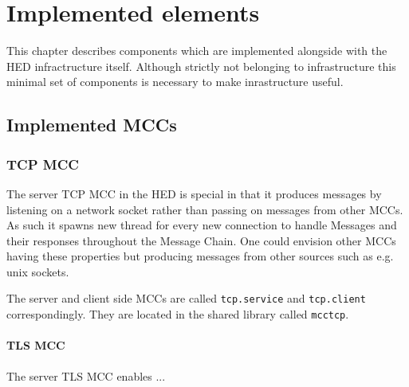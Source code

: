 \documentclass{book}
\begin{document}


\chapter{Implemented elements}

This chapter describes components which are implemented alongside with the HED infractructure itself. Although strictly not belonging to infrastructure this minimal set of components is necessary to make inrastructure useful.


\section{Implemented MCCs}


\subsection{TCP MCC}

The server TCP MCC in the HED is special in that it produces messages by listening on a network socket rather than passing on messages from other MCCs. As such it spawns new thread for every new connection to handle Messages and their responses throughout the Message Chain. One could envision other MCCs having these properties but producing messages from other sources such as e.g. unix sockets.



The server and client side MCCs are called \texttt{tcp.service} and \texttt{tcp.client} correspondingly. They are located in the shared library called \texttt{mcctcp}.

\subsubsection{TLS MCC}
The server TLS MCC enables ...
\end{document}
